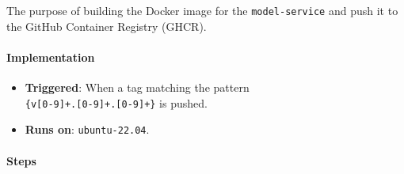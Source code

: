 The purpose of building the Docker image for the \texttt{model-service} and push it to the GitHub Container Registry (GHCR).

\paragraph{Implementation}
\begin{itemize}
    \item \textbf{Triggered}: When a tag matching the pattern \\\verb|{v[0-9]+.[0-9]+.[0-9]+}| is pushed.
    \item \textbf{Runs on}: \texttt{ubuntu-22.04}.
\end{itemize}

\paragraph{Steps}
